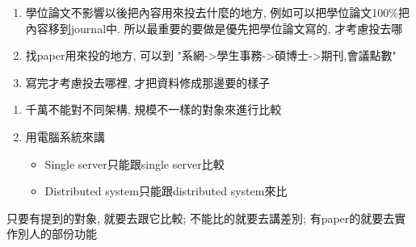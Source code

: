 
\begin{enumerate}
  \item
  {
    學位論文不影響以後把內容用來投去什麼的地方, 例如可以把學位論文100\%把內容移到journal中. 所以最重要的要做是優先把學位論文寫的, 才考慮投去哪
  } %

  \item
  {
    找paper用來投的地方, 可以到 "系網->學生事務->碩博士->期刊,會議點數"
  } %

  \item
  {
    寫完才考慮投去哪裡, 才把資料修成那邊要的樣子
  } %
\end{enumerate}


\begin{enumerate}
  \item
  {
    千萬不能對不同架構, 規模不一樣的對象來進行比較
  } %

  \item
  {
    用電腦系統來講
    \begin{itemize}
      \item
      {
        Single server只能跟single server比較
      } %

      \item
      {
        Distributed system只能跟distributed system來比
      } %
    \end{itemize}
  } %
\end{enumerate}


只要有提到的對象, 就要去跟它比較; 不能比的就要去講差別; 有paper的就要去實作別人的部份功能


